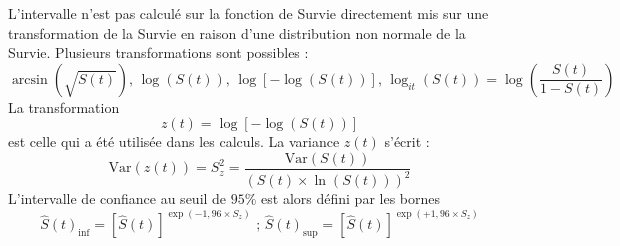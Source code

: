 \begin{itemize}
L'intervalle n'est pas calculé sur la fonction de Survie directement mis sur une
transformation de la Survie en raison d'une distribution non normale de la Survie.\newline
Plusieurs transformations sont possibles :
$$ \arcsin(\sqrt{S(t)})\textrm{, }\log(S(t))\textrm{, }\log[-\log(S(t))]\textrm{, }\log_{it}(S(t)) = \log\left(\frac{S(t)}{1-S(t)}\right)$$
La transformation 
$$ z(t) = \log[-\log(S(t))]$$
est celle qui a été utilisée dans les calculs.\newline
La variance $z(t)$ s'écrit : 
$$\textrm{Var}(z(t)) = S_{z}^{2} = \frac{\textrm{Var}(S(t))}{(S(t)\times \ln(S(t)))^{2}}$$
L'intervalle de confiance au seuil de $95\%$ est alors défini par les bornes 
$$\widehat{S}(t)_{\inf} = \left[\widehat{S}(t)\right]^{\exp(-1,96\times S_{z})} \textrm{ ; }\widehat{S}(t)_{\sup} = \left[\widehat{S}(t)\right]^{\exp(+1,96\times S_{z})}$$
\end{itemize}

\newpage

